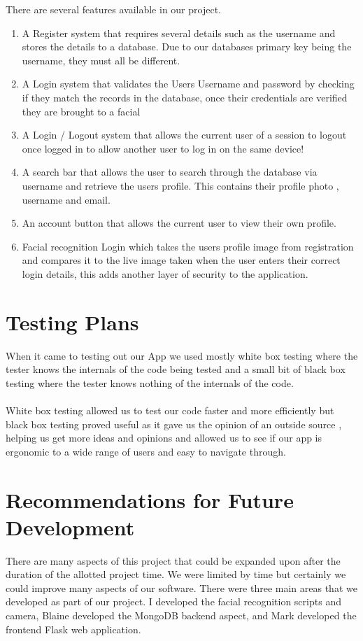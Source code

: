 \documentclass{article}
\begin{document}
There are several features available in our project.
\begin{enumerate}
    \item A Register system that requires several details such as the username and stores the details to a database.
    Due to our databases primary key being the username, they must all be different.
    \item A Login system that validates the Users Username and password by checking if they match the records in the database, once their credentials are verified they are brought to a facial 
    \item A Login / Logout system that allows the current user of a session to logout once logged in to allow another user to log in on the same device!
    \item A search bar that allows the user to search through the database  via username and retrieve the users profile.
    This contains their profile photo , username and email.
    \item An account button that allows the current user to view their own profile.
    \item Facial recognition Login which takes the users profile image from registration and compares it to the live image taken when the user enters their correct login details, this adds another layer of security to the application.

\end{enumerate}

\newpage

\section{Testing Plans}

When it came to testing out our App we used mostly white box testing where the tester knows the internals of the code being tested and a small bit of black box testing where the tester knows nothing of the internals of the code.
\\
\\
White box testing allowed us to test our code faster and more efficiently but black box testing proved useful as it gave us the opinion of an outside source  , helping us get more ideas and opinions and allowed us to see if our app is ergonomic to a wide range of users and easy to navigate through.

\newpage

\section{Recommendations for Future Development}
There are many aspects of this project that could be expanded upon after the duration of the allotted project time. We were limited by time but certainly we could improve many aspects of our software. There were three main areas that we developed as part of our project. I developed the facial recognition scripts and camera, Blaine developed the \cite{mongodb}MongoDB backend aspect, and Mark developed the frontend Flask web
application.
\\
\end{document}
